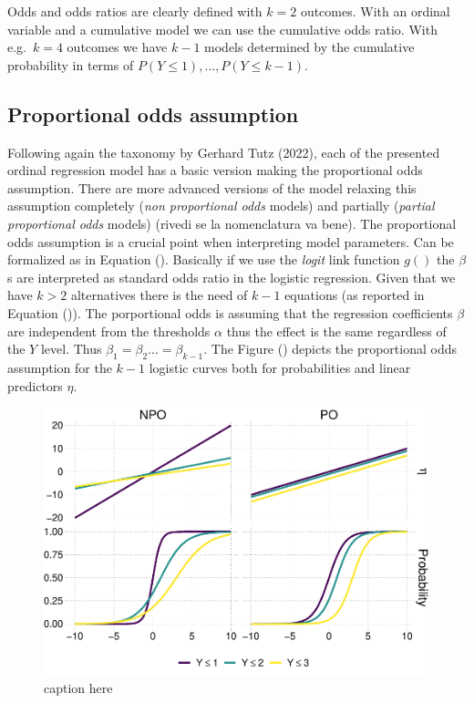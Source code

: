 \documentclass[
  man,floatsintext]{apa6}
\begin{document}
\normalsize

Odds and odds ratios are clearly defined with \(k = 2\) outcomes. With an ordinal variable and a cumulative model we can use the cumulative odds ratio. With e.g.~\(k = 4\) outcomes we have \(k - 1\) models determined by the cumulative probability in terms of \(P(Y \leq 1), \dots, P(Y \leq k - 1)\).

\subsection{Proportional odds assumption}\label{proportional-odds-assumption}

Following again the taxonomy by Gerhard Tutz (2022), each of the presented ordinal regression model has a basic version making the proportional odds assumption. There are more advanced versions of the model relaxing this assumption completely (\emph{non proportional odds} models) and partially (\emph{partial proportional odds} models) (rivedi se la nomenclatura va bene). The proportional odds assumption is a crucial point when interpreting model parameters. Can be formalized as in Equation (). Basically if we use the \emph{logit} link function \(g()\) the \(\beta\)s are interpreted as standard odds ratio in the logistic regression. Given that we have \(k > 2\) alternatives there is the need of \(k - 1\) equations (as reported in Equation ()). The porportional odds is assuming that the regression coefficients \(\beta\) are independent from the thresholds \(\alpha\) thus the effect is the same regardless of the \(Y\) level. Thus \(\beta_1 = \beta_2 \dots = \beta_{k - 1}\). The Figure () depicts the proportional odds assumption for the \(k - 1\) logistic curves both for probabilities and linear predictors \(\eta\).

\scriptsize

\begin{figure}

{\centering \includegraphics{paper-new_files/figure-latex/fig-prop-odds-1} 

}

\caption{caption here}\label{fig:fig-prop-odds}
\end{figure}
\end{document}

